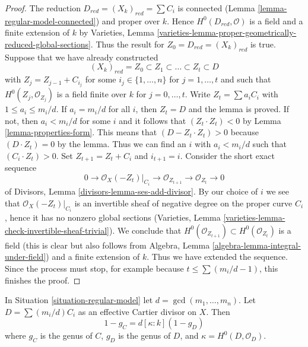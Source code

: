 \begin{proof}
The reduction $D_{red} = (X_k)_{red} = \sum C_i$ is connected
(Lemma \ref{lemma-regular-model-connected}) and proper over $k$. Hence
$H^0(D_{red}, \mathcal{O})$ is a field and a finite extension of
$k$ by Varieties, Lemma
\ref{varieties-lemma-proper-geometrically-reduced-global-sections}.
Thus the result for $Z_0 = D_{red} = (X_k)_{red}$ is true.
Suppose that we have already constructed
$$
(X_k)_{red} = Z_0 \subset Z_1 \subset \ldots \subset Z_t \subset D
$$
with $Z_j = Z_{j - 1} + C_{i_j}$ for some $i_j \in \{1, \ldots, n\}$
for $j = 1, \ldots, t$ and such that $H^0(Z_j, \mathcal{O}_{Z_j})$
is a field finite over $k$ for $j = 0, \ldots, t$.
Write $Z_t = \sum a_i C_i$ with $1 \leq a_i \leq m_i/d$.
If $a_i = m_i/d$ for all $i$, then $Z_t = D$ and the lemma is proved.
If not, then $a_i < m_i/d$ for some $i$ and it follows that
$(Z_t \cdot Z_t) < 0$ by Lemma \ref{lemma-properties-form}. This means that
$(D - Z_t \cdot Z_t) > 0$ because $(D \cdot Z_t) = 0$ by the lemma.
Thus we can find an $i$ with $a_i < m_i/d$ such that
$(C_i \cdot Z_t) > 0$. Set $Z_{t + 1} = Z_t + C_i$ and $i_{t + 1} = i$.
Consider the short exact sequence
$$
0 \to \mathcal{O}_X(-Z_t)|_{C_i} \to \mathcal{O}_{Z_{t + 1}} \to
\mathcal{O}_{Z_t} \to 0
$$
of Divisors, Lemma \ref{divisors-lemma-ses-add-divisor}.
By our choice of $i$ we see that
$\mathcal{O}_X(-Z_t)|_{C_i}$ is an invertible sheaf of negative degree
on the proper curve $C_i$, hence it has no nonzero global sections
(Varieties, Lemma \ref{varieties-lemma-check-invertible-sheaf-trivial}).
We conclude that $H^0(\mathcal{O}_{Z_{t + 1}}) \subset H^0(\mathcal{O}_{Z_t})$
is a field (this is clear but also follows from
Algebra, Lemma \ref{algebra-lemma-integral-under-field})
and a finite extension of $k$. Thus we have extended the sequence.
Since the process must stop, for example because $t \leq \sum (m_i/d - 1)$,
this finishes the proof.
\end{proof}

\begin{lemma}
\label{lemma-regular-model-genus}
\begin{reference}
\cite[Lemma 2.6]{Artin-Winters}
\end{reference}
In Situation \ref{situation-regular-model} let $d = \gcd(m_1, \ldots, m_n)$.
Let $D = \sum (m_i/d) C_i$ as an effective Cartier divisor on $X$. Then
$$
1 - g_C = d [\kappa : k] (1 - g_D)
$$
where $g_C$ is the genus of $C$, $g_D$ is the genus of $D$, and
$\kappa = H^0(D, \mathcal{O}_D)$.
\end{lemma}

